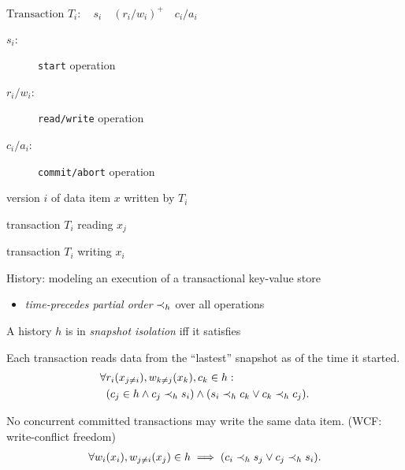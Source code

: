\begin{frame}{}
  $\text{Transaction } T_i:\quad s_i\quad (r_i/w_i)^{+}\quad c_i/a_i$

  \begin{description}
    \item[$s_i$:] \texttt{start} operation
    \item[$r_i/w_i$:] \texttt{read/write} operation
    \item[$c_i/a_i$:] \texttt{commit/abort} operation
  \end{description}

  \pause
  \vspace{0.20cm}
  \begin{description}[$w_i(x_i)$:]
    \item[$x_i$:] version $i$ of data item $x$ written by $T_i$
    \item[$r_i(x_j)$:] transaction $T_i$ reading $x_j$
    \item[$w_i(x_i)$:] transaction $T_i$ writing $x_i$
  \end{description}

  \pause
  \vspace{0.80cm}
  History: modeling an execution of a transactional key-value store
  \begin{itemize}
    \item \emph{time-precedes partial order} $\prec_{h}$ over all operations
  \end{itemize}
\end{frame}

\begin{frame}{}
  A history $h$ is in \emph{\large snapshot isolation} iff it satisfies  \\[0.20cm]
  \begin{description}
    \item[Snapshot Read:] %
      Each transaction reads data from the ``lastest'' snapshot as of the time it started.
      \begin{align*}
	\forall &r_i(x_{j \neq i}), w_{k \neq j}(x_k), c_k \in h: \\
	& (c_j \in h \land c_j \prec_{h} s_i)
	 \land (s_i \prec_{h} c_k \lor c_k \prec_{h} c_j).
      \end{align*}
    \pause
    \item[Snapshot Write:] No concurrent committed transactions may write the same data item. (WCF: write-conflict freedom)
      \begin{align*}
	\forall w_i(x_i), w_{j \neq i}(x_j) \in h \implies (c_i \prec_{h} s_j \lor c_j \prec_{h} s_i).
      \end{align*}
  \end{description}
\end{frame}
